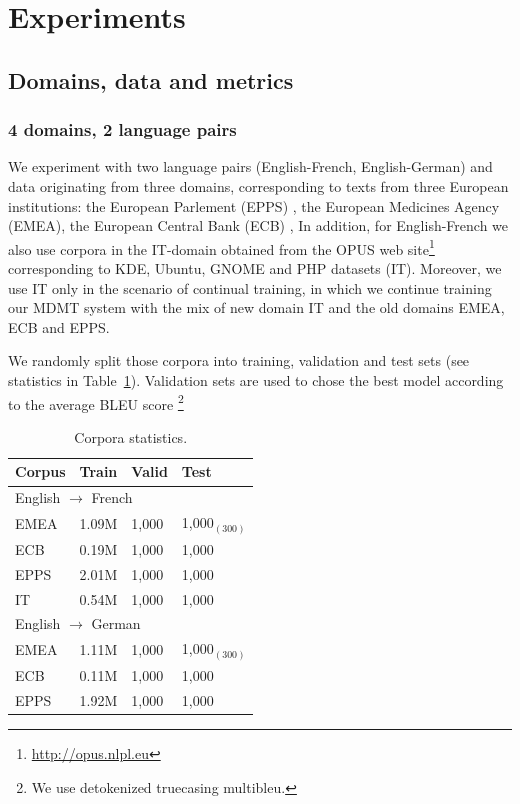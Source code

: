 \section{Experiments \label{sec:experiments-chap5}}
\subsection{Domains, data and metrics \label{ssec:data-chap5}}
\subsubsection{4 domains, 2 language pairs}
We experiment with two language pairs (English-French, English-German) and data originating from three domains, corresponding to texts from three European institutions: 
the European Parlement (EPPS) \citep{Koehn05europarl}, 
the European Medicines Agency (EMEA), 
the European Central Bank (ECB) \citep{Tiedemann09news},
In addition, for English-French we also use corpora in the IT-domain obtained from the OPUS web site\footnote{\url{http://opus.nlpl.eu}} corresponding to KDE, Ubuntu, GNOME and PHP datasets (IT). Moreover, we use IT only in the scenario of continual training, in which we continue training our MDMT system with the mix of new domain IT and the old domains EMEA, ECB and EPPS.

We randomly split those corpora into training, validation and test sets (see statistics in Table~\ref{tab:Corpora-chap5}).
Validation sets are used to chose the best model according to the average BLEU score \citep{Papineni02bleu}\footnote{We use detokenized truecasing multibleu.}

\begin{table}[h]
  \centering
  \begin{tabular}{ |llll|} %
    \hline
    Corpus & Train & Valid & Test \\ 
    \hline
    \multicolumn{4}{l}{English $\rightarrow$ French }\\
    \hline
    EMEA  & 1.09M & 1,000 & 1,000$_{(300)}$\\
    ECB    & 0.19M & 1,000 & 1,000     \\
    EPPS   & 2.01M  & 1,000 & 1,000  \\
    IT         & 0.54M  & 1,000 & 1,000 \\  
    \hline
    \multicolumn{4}{l}{English $\rightarrow$ German}\\
    \hline
    EMEA  & 1.11M & 1,000 & 1,000$_{(300)}$ \\
    ECB     &  0.11M & 1,000 & 1,000  \\
    EPPS   & 1.92M & 1,000 & 1,000 \\ 
    \hline
\end{tabular}
\caption{Corpora statistics.}
\label{tab:Corpora-chap5}
\end{table}

